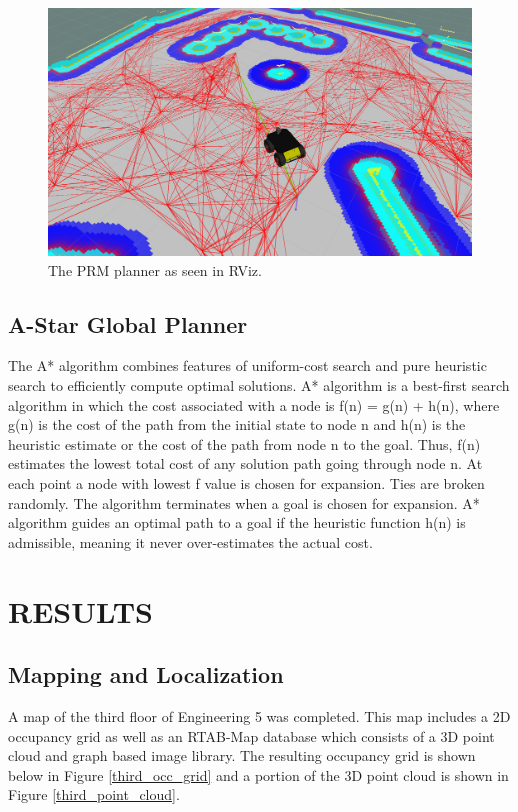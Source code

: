 \documentclass[letterpaper, 10 pt, conference]{ieeeconf}  %
\begin{document}
	\begin{figure}[!ht]
		\centering
		\includegraphics[width=1.0\columnwidth]{Figures/PRM_CloseUP}
		\caption{The PRM planner as seen in RViz.}
		\label{PRM_planner}
	\end{figure}

\subsection{A-Star Global Planner}

The A* algorithm combines features of uniform-cost search and pure heuristic search to efficiently compute optimal solutions. A* algorithm is a best-first search algorithm in which the cost associated with a node is f(n) = g(n) + h(n), where g(n) is the cost of the path from the initial state to node n and h(n) is the heuristic estimate or the cost of the path from node n to the goal. Thus, f(n) estimates the lowest total cost of any solution path going through node n. At each point a node with lowest f value is chosen for expansion. Ties are broken randomly. The algorithm terminates when a goal is chosen for expansion. A* algorithm guides an optimal path to a goal if the heuristic function h(n) is admissible, meaning it never over-estimates the actual cost. 

\section{RESULTS}

\subsection{Mapping and Localization}

A map of the third floor of Engineering 5 was completed. This map includes a 2D occupancy grid as well as an RTAB-Map database which consists of a 3D point cloud and graph based image library. The resulting occupancy grid is shown below in Figure \ref{third_occ_grid} and a portion of the 3D point cloud is shown in Figure \ref{third_point_cloud}.
\end{document}
